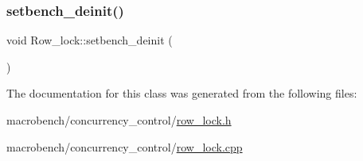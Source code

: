 \mbox{\label{classRow__lock_a1d79fae5c2c99d47eed437628ef21ab5}} 
\subsubsection{\texorpdfstring{setbench\+\_\+deinit()}{setbench\_deinit()}}
{\footnotesize\ttfamily void Row\+\_\+lock\+::setbench\+\_\+deinit (\begin{DoxyParamCaption}{ }\end{DoxyParamCaption})}



The documentation for this class was generated from the following files\+:\begin{DoxyCompactItemize}
\item 
macrobench/concurrency\+\_\+control/\hyperlink{row__lock_8h}{row\+\_\+lock.\+h}\item 
macrobench/concurrency\+\_\+control/\hyperlink{row__lock_8cpp}{row\+\_\+lock.\+cpp}\end{DoxyCompactItemize}

